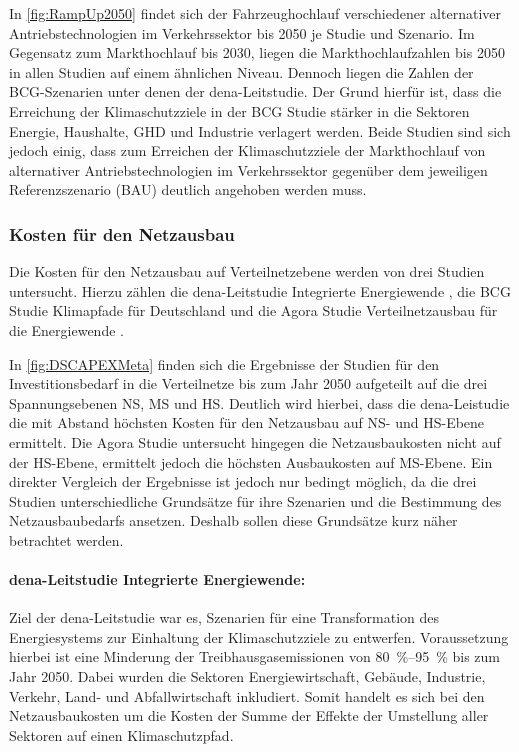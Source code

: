 In \autoref{fig:RampUp2050} findet sich der Fahrzeughochlauf verschiedener alternativer Antriebstechnologien im Verkehrssektor bis \num{2050} je Studie und Szenario.
Im Gegensatz zum Markthochlauf bis \num{2030}, liegen die Markthochlaufzahlen bis \num{2050} in allen Studien auf einem ähnlichen Niveau.
Dennoch liegen die Zahlen der BCG-Szenarien unter denen der dena-Leitstudie.
Der Grund hierfür ist, dass die Erreichung der Klimaschutzziele in der BCG Studie stärker in die Sektoren Energie, Haushalte, \gls{GHD} und Industrie verlagert werden.
Beide Studien sind sich jedoch einig, dass zum Erreichen der Klimaschutzziele der Markthochlauf von alternativer Antriebstechnologien im Verkehrssektor gegenüber dem jeweiligen Referenzszenario (\gls{BAU}) deutlich angehoben werden muss.

\subsubsection{Kosten für den Netzausbau}

Die Kosten für den Netzausbau auf Verteilnetzebene werden von drei Studien untersucht.
Hierzu zählen die dena-Leitstudie \glqq Integrierte Energiewende\grqq{} \cite{DEAGH2018}, die BCG Studie \glqq Klimapfade für Deutschland\grqq{} \cite{BCG2018} und die Agora Studie \glqq Verteilnetzausbau für die Energiewende\grqq{} \cite{Agora2019}.



In \autoref{fig:DSCAPEXMeta} finden sich die Ergebnisse der Studien für den Investitionsbedarf in die Verteilnetze bis zum Jahr \num{2050} aufgeteilt auf die drei Spannungsebenen \gls{NS}, \gls{MS} und \gls{HS}.
Deutlich wird hierbei, dass die dena-Leistudie die mit Abstand höchsten Kosten für den Netzausbau auf \gls{NS}- und \gls{HS}-Ebene ermittelt.
Die Agora Studie untersucht hingegen die Netzausbaukosten nicht auf der \gls{HS}-Ebene, ermittelt jedoch die höchsten Ausbaukosten auf \gls{MS}-Ebene.
Ein direkter Vergleich der Ergebnisse ist jedoch nur bedingt möglich, da die drei Studien unterschiedliche Grundsätze für ihre Szenarien und die Bestimmung des Netzausbaubedarfs ansetzen.
Deshalb sollen diese Grundsätze kurz näher betrachtet werden.

\paragraph{dena-Leitstudie \glqq Integrierte Energiewende\grqq:}

Ziel der dena-Leitstudie war es, Szenarien für eine Transformation des Energiesystems zur Einhaltung der Klimaschutzziele zu entwerfen.
Voraussetzung hierbei ist eine Minderung der Treibhausgasemissionen von \SIrange[range-phrase=~{--}~]{80}{95}{\percent} bis zum Jahr \num{2050}.
Dabei wurden die Sektoren Energiewirtschaft, Gebäude, Industrie, Verkehr, Land- und
Abfallwirtschaft inkludiert.
Somit handelt es sich bei den Netzausbaukosten um die Kosten der Summe der Effekte der Umstellung aller Sektoren auf einen Klimaschutzpfad.\medskip

